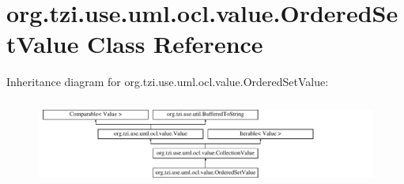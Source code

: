\hypertarget{classorg_1_1tzi_1_1use_1_1uml_1_1ocl_1_1value_1_1_ordered_set_value}{\section{org.\-tzi.\-use.\-uml.\-ocl.\-value.\-Ordered\-Set\-Value Class Reference}
\label{classorg_1_1tzi_1_1use_1_1uml_1_1ocl_1_1value_1_1_ordered_set_value}
}
Inheritance diagram for org.\-tzi.\-use.\-uml.\-ocl.\-value.\-Ordered\-Set\-Value\-:\begin{figure}[H]
\begin{center}
\leavevmode
\includegraphics[height=2.860792cm]{classorg_1_1tzi_1_1use_1_1uml_1_1ocl_1_1value_1_1_ordered_set_value}
\end{center}
\end{figure}

